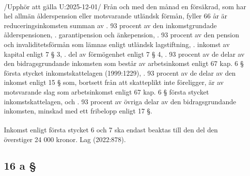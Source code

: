\documentclass[a4paper,notitlepage,openany,10pt]{book}
\begin{document}
\paragraph*{}
/Upphör att gälla U:2025-12-01/
Från och med den månad en försäkrad, som har hel allmän ålderspension eller motsvarande utländsk förmån, fyller 66 år är reduceringsinkomsten summan av
. 93 procent av den inkomstgrundade ålderspensionen,
. garantipension och änkepension,
. 93 procent av den pension och invaliditetsförmån som lämnas enligt utländsk lagstiftning,
. inkomst av kapital enligt 7 § 3,
. del av förmögenhet enligt 7 § 4,
. 93 procent av de delar av den bidragsgrundande inkomsten som består av arbetsinkomst enligt 67 kap. 6 § första stycket inkomstskattelagen (1999:1229),
. 93 procent av de delar av den inkomst enligt 15 § som, bortsett från att skatteplikt inte föreligger, är av motsvarande slag som arbetsinkomst enligt 67 kap. 6 § första stycket inkomstskattelagen, och
. 93 procent av övriga delar av den bidragsgrundande inkomsten, minskad med ett fribelopp enligt 17 §.
\paragraph*{}
Inkomst enligt första stycket 6 och 7 ska endast beaktas till den del den överstiger 24 000 kronor.
Lag (2022:878).
\subsection*{16 a §}
\end{document}
